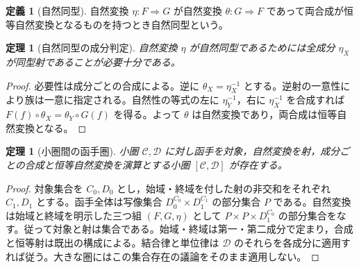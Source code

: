 \documentclass[a5paper,10pt,dvipdfmx]{jsarticle}
\theoremstyle{definition}
\newtheorem{defn}[ruledef]{定義}
\theoremstyle{plain}
\newtheorem{thm}[ruledef]{定理}
\begin{document}
\begin{defn}[自然同型]\label{k279}
自然変換 $\eta\colon F\Rightarrow G$ が自然変換 $\theta\colon G\Rightarrow F$ であって両合成が恒等自然変換となるものを持つとき自然同型という。
\end{defn}
\begin{thm}[自然同型の成分判定]\label{k280}
自然変換 $\eta$ が自然同型であるためには全成分 $\eta_X$ が同型射であることが必要十分である。
\end{thm}
\begin{proof}
必要性は成分ごとの合成による。逆に $\theta_X=\eta_X^{-1}$ とする。逆射の一意性により族は一意に指定される。自然性の等式の左に $\eta_Y^{-1}$，右に $\eta_X^{-1}$ を合成すれば $F(f)\circ\theta_X=\theta_Y\circ G(f)$ を得る。よって $\theta$ は自然変換であり，両合成は恒等自然変換となる。
\end{proof}
\begin{thm}[小圏間の函手圏]\label{k281}
小圏 $\mathcal C,\mathcal D$ に対し函手を対象，自然変換を射，成分ごとの合成と恒等自然変換を演算とする小圏 $[\mathcal C,\mathcal D]$ が存在する。
\end{thm}
\begin{proof}
対象集合を $C_0,D_0$ とし，始域・終域を付した射の非交和をそれぞれ $C_1,D_1$ とする。函手全体は写像集合 $D_0^{C_0}\times D_1^{C_1}$ の部分集合 $P$ である。自然変換は始域と終域を明示した三つ組 $(F,G,\eta)$ として $P\times P\times D_1^{C_0}$ の部分集合をなす。従って対象と射は集合である。始域・終域は第一・第二成分で定まり，合成と恒等射は既出の構成による。結合律と単位律は $\mathcal D$ のそれらを各成分に適用すれば従う。大きな圏にはこの集合存在の議論をそのまま適用しない。
\end{proof}
\par\medskip{}
\end{document}
